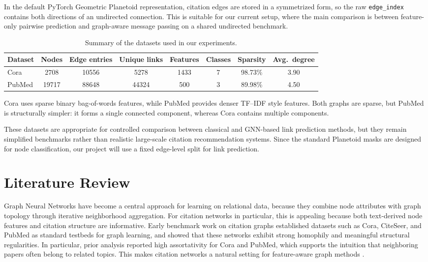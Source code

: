 \documentclass[11pt,a4paper]{article}
\begin{document}
In the default PyTorch Geometric Planetoid representation, citation edges are stored in a symmetrized form,
so the raw \texttt{edge\_index} contains both directions of an undirected connection.
This is suitable for our current setup, where the main comparison is between feature-only pairwise prediction and graph-aware message passing on a shared undirected benchmark.

\begin{table}[h]
\centering
\begin{tabular}{lccccccc}
\toprule
Dataset & Nodes & Edge entries & Unique links & Features & Classes & Sparsity & Avg.\ degree \\
\midrule
Cora   & 2708  & 10556 & 5278  & 1433 & 7 & 98.73\% & 3.90 \\
PubMed & 19717 & 88648 & 44324 & 500  & 3 & 89.98\% & 4.50 \\
\bottomrule
\end{tabular}
\caption{Summary of the datasets used in our experiments.}
\end{table}

Cora uses sparse binary bag-of-words features, while PubMed provides denser TF--IDF style features.
Both graphs are sparse, but PubMed is structurally simpler: it forms a single connected component,
whereas Cora contains multiple components.

These datasets are appropriate for controlled comparison between classical and GNN-based link prediction methods,
but they remain simplified benchmarks rather than realistic large-scale citation recommendation systems.
Since the standard Planetoid masks are designed for node classification, our project will use a fixed edge-level split for link prediction.

\section{Literature Review}

Graph Neural Networks have become a central approach for learning on relational data,
because they combine node attributes with graph topology through iterative neighborhood aggregation.
For citation networks in particular, this is appealing because both text-derived node features
and citation structure are informative.
Early benchmark work on citation graphs established datasets such as Cora, CiteSeer, and PubMed
as standard testbeds for graph learning, and showed that these networks exhibit strong homophily
and meaningful structural regularities.
In particular, prior analysis reported high assortativity for Cora and PubMed,
which supports the intuition that neighboring papers often belong to related topics.
This makes citation networks a natural setting for feature-aware graph methods
\cite{sen2008collective,namata2012query}.
\end{document}
